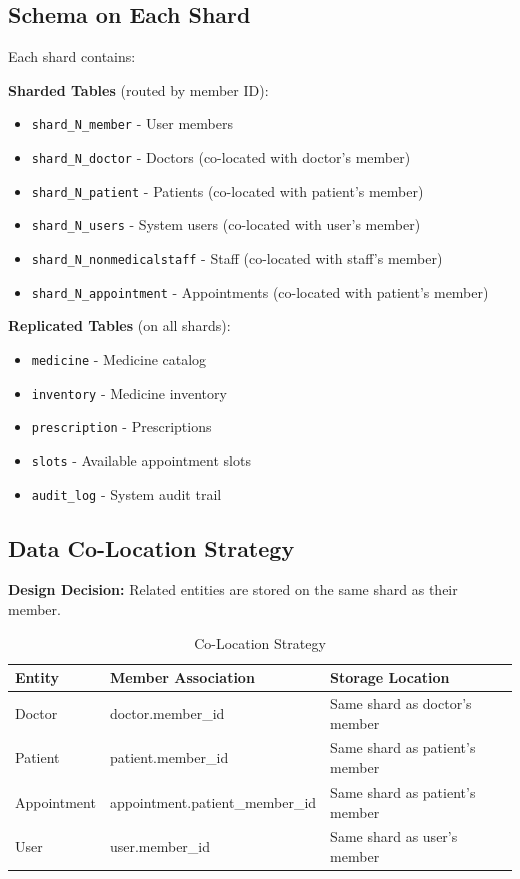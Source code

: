 \documentclass[12pt,a4paper]{article}
\begin{document}
\subsection{Schema on Each Shard}

Each shard contains:

\textbf{Sharded Tables} (routed by member ID):
\begin{itemize}
    \item \texttt{shard\_N\_member} - User members
    \item \texttt{shard\_N\_doctor} - Doctors (co-located with doctor's member)
    \item \texttt{shard\_N\_patient} - Patients (co-located with patient's member)
    \item \texttt{shard\_N\_users} - System users (co-located with user's member)
    \item \texttt{shard\_N\_nonmedicalstaff} - Staff (co-located with staff's member)
    \item \texttt{shard\_N\_appointment} - Appointments (co-located with patient's member)
\end{itemize}

\textbf{Replicated Tables} (on all shards):
\begin{itemize}
    \item \texttt{medicine} - Medicine catalog
    \item \texttt{inventory} - Medicine inventory
    \item \texttt{prescription} - Prescriptions
    \item \texttt{slots} - Available appointment slots
    \item \texttt{audit\_log} - System audit trail
\end{itemize}

\subsection{Data Co-Location Strategy}

\textbf{Design Decision:} Related entities are stored on the same shard as their member.

\begin{table}[H]
\centering
\begin{tabularx}{\textwidth}{|l|X|X|}
\hline
\textbf{Entity} & \textbf{Member Association} & \textbf{Storage Location} \\
\hline
Doctor & doctor.member\_id & Same shard as doctor's member \\
Patient & patient.member\_id & Same shard as patient's member \\
Appointment & appointment.patient\_member\_id & Same shard as patient's member \\
User & user.member\_id & Same shard as user's member \\
\hline
\end{tabularx}
\caption{Co-Location Strategy}
\end{table}
\end{document}
